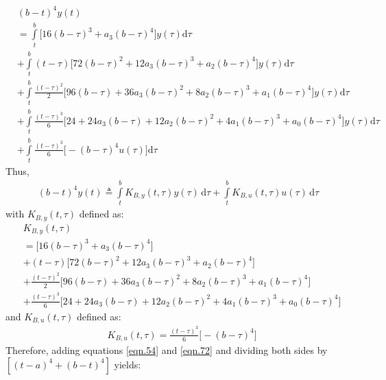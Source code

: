 \documentclass{article}
\begin{document}
\begin{equation}\label{eqn.71}
\begin{split}
	&(b-t)^{4}y(t)\\
	&=\int\limits_{t}^{b}\bigg[16(b-\tau)^{3} + a_3(b-\tau)^{4}\bigg]y(\tau)\mathrm{d}\tau\\
	&+\int\limits_{t}^{b}(t-\tau)\bigg[72(b-\tau)^{2} + 12a_3(b-\tau)^{3} + a_2(b-\tau)^{4}\bigg]y(\tau)\mathrm{d}\tau\\
	&+\int\limits_{t}^{b}\frac{(t-\tau)^{2}}{2}\bigg[96(b-\tau)+36a_3(b-\tau)^{2} + 8a_2(b-\tau)^{3} + a_1(b-\tau)^{4}\bigg]y(\tau)\mathrm{d}\tau\\
	&+\int\limits_{t}^{b}\frac{(t-\tau)^{3}}{6}\bigg[24+24a_3(b-\tau)+12a_2(b-\tau)^{2}+4a_1(b-\tau)^{3}+a_0(b-\tau)^{4}\bigg]y(\tau)\mathrm{d}\tau\\
	&+\int\limits_{t}^{b}\frac{(t-\tau)^{3}}{6}\bigg[-(b-\tau)^{4}u(\tau)\bigg]\mathrm{d}\tau
\end{split}
\end{equation}
Thus,
\begin{equation}\label{eqn.72}
\begin{split}
	(b-t)^{4}y(t)\triangleq \int\limits_{t}^{b} K_{B,y}(t,\tau) y(\tau)\, \mathrm{d}\tau + \int\limits_{t}^{b} K_{B,u}(t,\tau) u(\tau)\, \mathrm{d}\tau
\end{split}
\end{equation}
with $K_{B,y}(t,\tau)$ defined as:
\begin{equation}\label{eqn.73}
\begin{split}
	&K_{B,y}(t,\tau)\\
	&=\bigg[16(b-\tau)^{3} + a_3(b-\tau)^{4}\bigg]\\
	&+(t-\tau)\bigg[72(b-\tau)^{2} + 12a_3(b-\tau)^{3} + a_2(b-\tau)^{4}\bigg]\\
	&+\frac{(t-\tau)^{2}}{2}\bigg[96(b-\tau)+36a_3(b-\tau)^{2} + 8a_2(b-\tau)^{3} + a_1(b-\tau)^{4}\bigg]\\
	&+\frac{(t-\tau)^{3}}{6}\bigg[24+24a_3(b-\tau)+12a_2(b-\tau)^{2}+4a_1(b-\tau)^{3}+a_0(b-\tau)^{4}\bigg]
\end{split}
\end{equation}
and $K_{B,u}(t,\tau)$  defined as:
\begin{equation}\label{eqn.74}
\begin{split}
	&K_{B,u}(t,\tau)=\frac{(t-\tau)^{3}}{6}\bigg[-(b-\tau)^{4}\bigg]
\end{split}
\end{equation}
Therefore, adding equations \eqref{eqn.54} and \eqref{eqn.72} and dividing both sides by \\$[(t-a)^{4}+(b-t)^{4}]$ yields:
\end{document}
